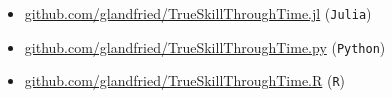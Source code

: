 \documentclass[a4paper,10pt]{book}
\theoremstyle{definition}
\newif\ifen
\newif\ifes
\newcommand{\en}[1]{\ifen#1\fi}
\newcommand{\es}[1]{\ifes#1\fi}
\begin{document}
\en{The source codes for the TrueSkill Through Time packages can be found at:}
\es{Los códigos fuentes de los paquetes TrueSkill Through Time se encuentran en:}
\begin{itemize}
\item \href{github.com/glandfried/TrueSkillThroughTime.jl}{\url{github.com/glandfried/TrueSkillThroughTime.jl}} (\texttt{Julia})
\item \href{github.com/glandfried/TrueSkillThroughTime.py}{\url{github.com/glandfried/TrueSkillThroughTime.py}}  (\texttt{Python})
\item \href{github.com/glandfried/TrueSkillThroughTime.R}{\url{github.com/glandfried/TrueSkillThroughTime.R}}  (\texttt{R})
\end{itemize}
% 
% 
% 
% 
%  
% 
\end{document}
